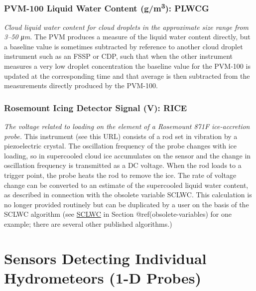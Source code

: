\documentclass[
  english,
]{book}
\begin{document}
\hypertarget{plwcg}{%
\subsubsection*{\texorpdfstring{PVM-100 Liquid Water Content
(g/m\textsuperscript{3}):
PLWCG}{PVM-100 Liquid Water Content (g/m3): PLWCG}}\label{plwcg}}

\emph{Cloud liquid water content for cloud droplets in the approximate
size range from 3--50 {\emph{μ}}m.} The PVM produces a measure of the
liquid water content directly, but a baseline value is sometimes
subtracted by reference to another cloud droplet instrument such as an
FSSP or CDP, such that when the other instrument measures a very low
droplet concentration the baseline value for the PVM-100 is updated at
the corresponding time and that average is then subtracted from the
measurements directly produced by the PVM-100.

\hypertarget{rice}{%
\subsubsection*{Rosemount Icing Detector Signal (V): RICE}\label{rice}}

\emph{The voltage related to loading on the element of a Rosemount 871F
ice-accretion probe.} This instrument (see this URL) consists of a rod
set in vibration by a piezoelectric crystal. The oscillation frequency
of the probe changes with ice loading, so in supercooled cloud ice
accumulates on the sensor and the change in oscillation frequency is
transmitted as a DC voltage. When the rod loads to a trigger point, the
probe heats the rod to remove the ice. The rate of voltage change can be
converted to an estimate of the supercooled liquid water content, as
described in connection with the obsolete variable SCLWC. This
calculation is no longer provided routinely but can be duplicated by a
user on the basis of the SCLWC algorithm (see
\protect\hyperlink{SCLWC}{SCLWC} in Section @ref(obsolete-variables) for
one example; there are several other published algorithms.)

\hypertarget{sensors-1-D-probes}{%
\section{Sensors Detecting Individual Hydrometeors (1-D
Probes)}\label{sensors-1-D-probes}}
\end{document}
